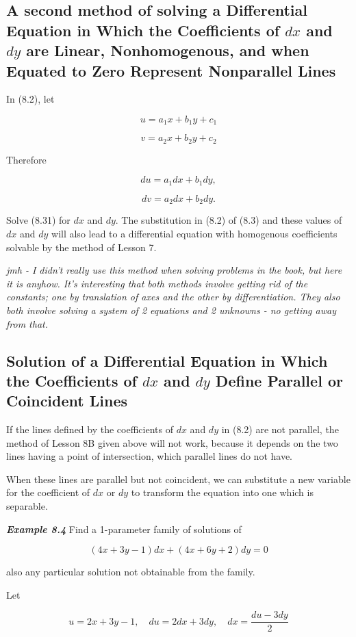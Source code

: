 \documentclass{article}
\begin{document}
\subsection{A second method of solving a Differential Equation in Which the Coefficients of $dx$ and $dy$ are Linear, Nonhomogenous, and when Equated to Zero Represent Nonparallel Lines}

In (8.2), let

\[ u = a_1x + b_1y + c_1 \tag{8.3} \]

\[ v = a_2x + b_2y + c_2 \]

Therefore

\[ du = a_1dx + b_1dy, \tag{8.31} \]

\[ dv = a_2dx + b_2dy. \]

Solve (8.31) for $dx$ and $dy$. The substitution in (8.2) of (8.3) and these values of $dx$ and $dy$ will also lead to a differential equation with homogenous coefficients solvable by the method of Lesson 7.

\emph{jmh - I didn't really use this method when solving problems in the book, but here it is anyhow. It's interesting that both methods involve getting rid of the constants; one by translation of axes and the other by differentiation. They also both involve solving a system of 2 equations and 2 unknowns - no getting away from that.}

\subsection{Solution of a Differential Equation in Which the Coefficients of $dx$ and $dy$ Define Parallel or Coincident Lines}
If the lines defined by the coefficients of $dx$ and $dy$ in (8.2) are not parallel, the method of Lesson 8B given above will not work, because it depends on the two lines having a point of intersection, which parallel lines do not have.

When these lines are parallel but not coincident, we can substitute a new variable for the coefficient of $dx$ or $dy$ to transform the equation into one which is separable.

\emph{\textbf{Example 8.4}}
Find a 1-parameter family of solutions of

\[ (4x +3y -1)dx + (4x + 6y +2)dy = 0 \tag{a} \]

also any particular solution not obtainable from the family.

Let

\[ u = 2x + 3y - 1, \quad du = 2dx +3dy, \quad dx = \frac{du -3dy}{2} \tag{b} \]
\end{document}
